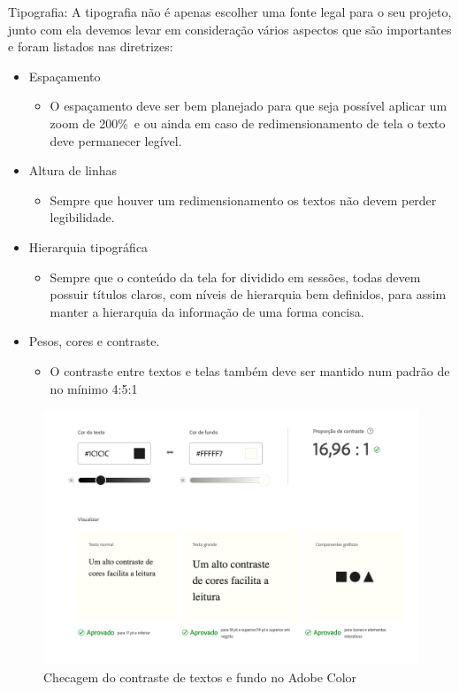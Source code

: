 {\newpage
Tipografia: A tipografia não é apenas escolher uma fonte legal para o seu projeto, junto com ela devemos levar em consideração vários aspectos que são importantes e foram listados nas diretrizes: 
\begin{itemize}
\item Espaçamento
\begin{itemize}
\item O espaçamento deve ser bem planejado para que seja possível aplicar um zoom de 200\%\ e ou ainda em caso de redimensionamento de tela o texto deve permanecer legível. 
\end{itemize}
\item Altura de linhas
\begin{itemize}
\item Sempre que houver um redimensionamento os textos não devem perder legibilidade.
\end{itemize}
\item Hierarquia tipográfica
\begin{itemize}
\item Sempre que o conteúdo da tela for dividido em sessões, todas devem possuir títulos claros, com níveis de hierarquia bem definidos, para assim manter a hierarquia da informação de uma forma concisa. 
\end{itemize}
\item Pesos, cores e contraste. 
\begin{itemize}
\item O contraste entre textos e telas também deve ser mantido num padrão de no mínimo 4:5:1
\end{itemize}
\end{itemize}

\begin{figure}[ht]
        \centering
    	\includegraphics[width=1.0\textwidth]{images/contrast_check.png}
        \caption{Checagem do contraste de textos e fundo no Adobe Color}
\end{figure} 

}
